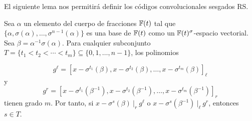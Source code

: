 El siguiente lema nos permitirá definir los códigos convolucionales sesgados RS.


\begin{lema}\label{lema:2}
Sea $\alpha$ un elemento del cuerpo de fracciones $\mathbb{F}(t)$ tal que $\{\alpha,\sigma(\alpha),\dots,\sigma^{n-1}(\alpha)\}$ es una base de $\mathbb{F}(t)$ como un $\mathbb{F}(t)^\sigma$-espacio vectorial. Sea $\beta = \alpha^{-1}\sigma(\alpha).$ Para cualquier subconjunto $T = \{t_1 < t_2  < \cdots < t_m\} \subseteq \{0,1,\dots,n-1\}$, los polinomios

\begin{equation}
g^{\ell} = \left[x - \sigma^{t_1}(\beta),x - \sigma^{t_2}(\beta),\dots,x-\sigma^{t_m}(\beta)\right]_\ell
\end{equation}
y
\begin{equation}
    g^{r} = \left[x - \sigma^{t_1}(\beta^{-1}),x - \sigma^{t_2}(\beta^{-1}),\dots,x-\sigma^{t_m}(\beta^{-1})\right]_r
\end{equation}
tienen grado $m$. Por tanto, si $x - \sigma^s(\beta) \ |_r \ g^\ell$ o $x - \sigma^s(\beta^{-1}) \ |_\ell \ g^r$, entonces $s \in T$.
\end{lema}

